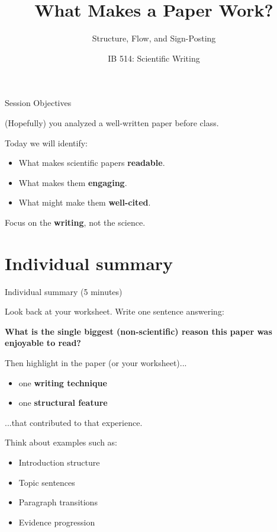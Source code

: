 \documentclass{beamer}
\title{What Makes a Paper Work?}
\subtitle{Structure, Flow, and Sign-Posting}
\author[]{IB 514: Scientific Writing}
\date{}
\begin{document}
\frame{\titlepage}


\begin{frame}{Session Objectives}

(Hopefully) you analyzed a well-written paper before class.

\vspace{0.5cm}

Today we will identify:

\begin{itemize}
\item What makes scientific papers \textbf{readable}.
\item What makes them \textbf{engaging}.
\item What might make them \textbf{well-cited}.
\end{itemize}

\vspace{0.5cm}

\center
Focus on the \textbf{writing}, not the science.
\vspace{0.5cm}
\scriptsize
\tableofcontents
\end{frame}


\section{Individual summary}
\begin{frame}{Individual summary (5 minutes)}

Look back at your worksheet.
Write one sentence answering:

\vspace{0.3cm}

\textbf{What is the single biggest (non-scientific) reason this paper was enjoyable to read?}

\vspace{0.5cm}

Then highlight in the paper (or your worksheet)...

\begin{itemize}
\item one \textbf{writing technique}
\item one \textbf{structural feature}
\end{itemize}

\hspace{2cm}...that contributed to that experience.


\vspace{0.5cm}

Think about examples such as:

\begin{itemize}
\item Introduction structure
\item Topic sentences
\item Paragraph transitions
\item Evidence progression
\end{itemize}

\end{frame}
\end{document}
